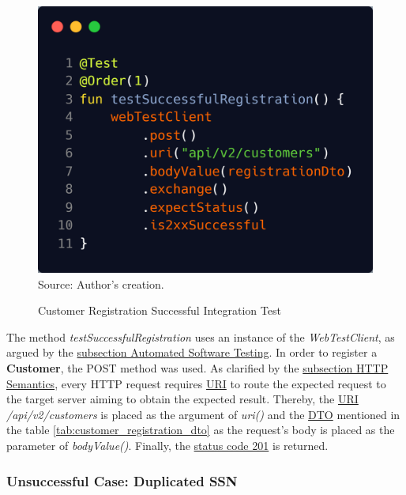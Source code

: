 \begin{figure}[H]
	\centering
	\caption{Customer Registration Successful Integration Test}
	\includegraphics[width=1\linewidth]{figures/customer_registration_integration_test_success.png}
	\label{fig:customer_registration_integration_test_success}
	\\ \footnotesize Source: Author's creation.
\end{figure}

The method \textit{testSuccessfulRegistration} uses an instance of the \textit{WebTestClient}, as argued by the \hyperref[subsection:automated_software_testing]{subsection Automated Software Testing}. In order to register a \textbf{Customer}, the POST method was used. As clarified by the \hyperref[subsection:http_semantics]{subsection HTTP Semantics}, every HTTP request requires \hyperref[appendix:glossary]{URI} to route the expected request to the target server aiming to obtain the expected result. Thereby, the \hyperref[appendix:glossary]{URI} \textit{/api/v2/customers} is placed as the argument of \textit{uri()} and the \hyperref[appendix:glossary]{DTO} mentioned in the table \ref{tab:customer_registration_dto} as the request's body is placed as the parameter of \textit{bodyValue()}. Finally, the \hyperref[tab:summary_http_status_codes]{status code 201} is returned.

\subsubsection{Unsuccessful Case: Duplicated SSN}
\label{customer_registration_unsuccessful_test_duplicated_ssn}

